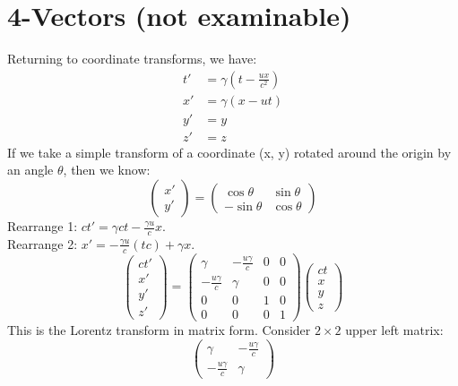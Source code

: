\documentclass[a4paper, 11pt, normalem]{report}
\begin{document}
\section{4-Vectors (not examinable)}
Returning to coordinate transforms, we have:
\begin{align}
    t' &= \gamma\left(t - \frac{ux}{c^{2}}\right) \\
    x' &= \gamma\left(x - ut\right) \\
    y' &= y \\
    z' &= z
\end{align}
If we take a simple transform of a coordinate (x, y) rotated around the origin by an angle $\theta$, then we know:
\begin{equation}
    \begin{pmatrix} x' \\  y' \end{pmatrix} = \begin{pmatrix} \cos{\theta}  & \sin{\theta} \\ -\sin{\theta} & \cos{\theta} \end{pmatrix}
\end{equation}
Rearrange 1: $ct' = \gamma ct - \frac{\gamma u}{c}x$. \\
Rearrange 2: $x' = -\frac{\gamma u}{c}(tc) + \gamma x$.
\begin{equation}
    \begin{pmatrix} ct' \\ x'\\ y' \\ z' \end{pmatrix} = \begin{pmatrix} \gamma & -\frac{u\gamma}{c} & 0 & 0 \\ -\frac{u\gamma}{c} & \gamma & 0 & 0 \\ 0 & 0 & 1 & 0 \\ 0 & 0 & 0 & 1 \end{pmatrix} \begin{pmatrix} ct \\ x \\ y \\ z \end{pmatrix}
\end{equation}
This is the Lorentz transform in matrix form.
Consider $2\times2$ upper left matrix:
\begin{equation}
    \begin{pmatrix} \gamma & -\frac{u\gamma}{c} \\ -\frac{u\gamma}{c} & \gamma \end{pmatrix}
\end{equation}
\end{document}
